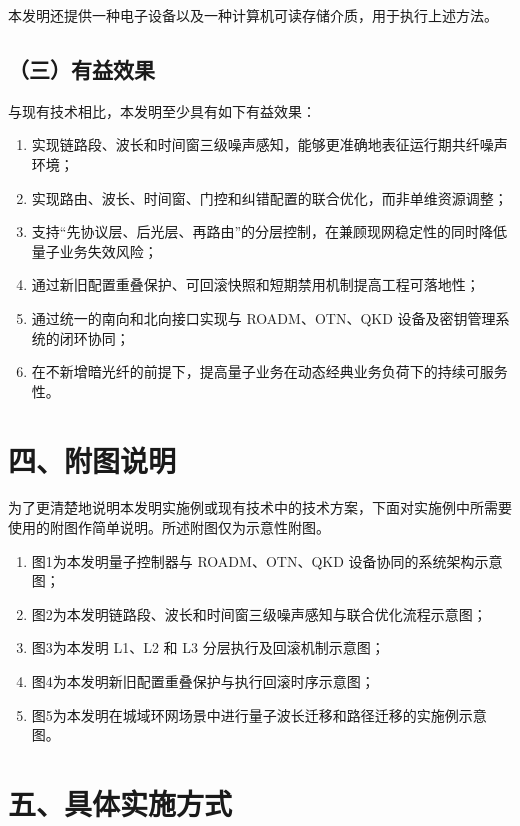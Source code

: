 \documentclass[12pt,a4paper]{article}
\begin{document}
本发明还提供一种电子设备以及一种计算机可读存储介质，用于执行上述方法。

\subsection*{（三）有益效果}

与现有技术相比，本发明至少具有如下有益效果：
\begin{enumerate}[leftmargin=2em]
    \item 实现链路段、波长和时间窗三级噪声感知，能够更准确地表征运行期共纤噪声环境；
    \item 实现路由、波长、时间窗、门控和纠错配置的联合优化，而非单维资源调整；
    \item 支持“先协议层、后光层、再路由”的分层控制，在兼顾现网稳定性的同时降低量子业务失效风险；
    \item 通过新旧配置重叠保护、可回滚快照和短期禁用机制提高工程可落地性；
    \item 通过统一的南向和北向接口实现与 ROADM、OTN、QKD 设备及密钥管理系统的闭环协同；
    \item 在不新增暗光纤的前提下，提高量子业务在动态经典业务负荷下的持续可服务性。
\end{enumerate}

\section*{四、附图说明}

为了更清楚地说明本发明实施例或现有技术中的技术方案，下面对实施例中所需要使用的附图作简单说明。所述附图仅为示意性附图。

\begin{enumerate}[leftmargin=2em]
    \item 图1为本发明量子控制器与 ROADM、OTN、QKD 设备协同的系统架构示意图；
    \item 图2为本发明链路段、波长和时间窗三级噪声感知与联合优化流程示意图；
    \item 图3为本发明 L1、L2 和 L3 分层执行及回滚机制示意图；
    \item 图4为本发明新旧配置重叠保护与执行回滚时序示意图；
    \item 图5为本发明在城域环网场景中进行量子波长迁移和路径迁移的实施例示意图。
\end{enumerate}

\section*{五、具体实施方式}
\end{document}
